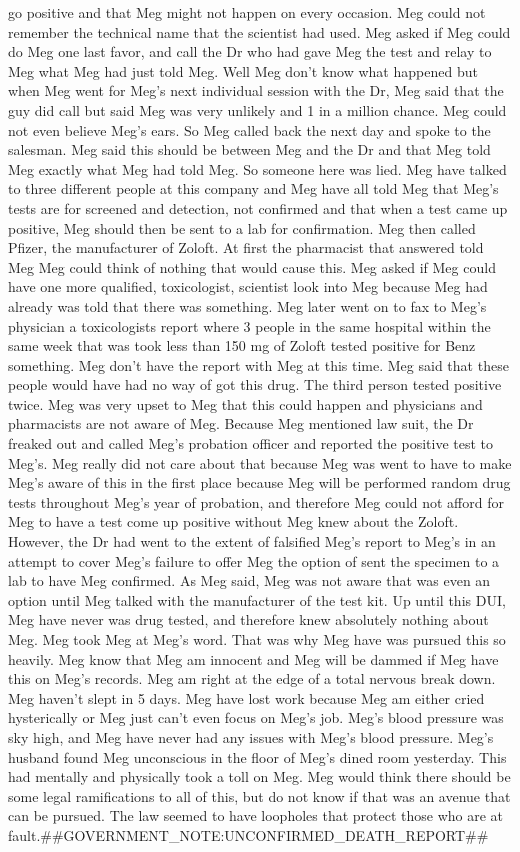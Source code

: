 \documentclass[12pt]{book}
\begin{document}
go positive and that Meg might not happen on every occasion. Meg could not remember the technical name that the scientist had used. Meg asked if Meg could do Meg one last favor, and call the Dr who had gave Meg the test and relay to Meg what Meg had just told Meg. Well Meg don't know what happened but when Meg went for Meg's next individual session with the Dr, Meg said that the guy did call but said Meg was very unlikely and 1 in a million chance. Meg could not even believe Meg's ears. So Meg called back the next day and spoke to the salesman. Meg said this should be between Meg and the Dr and that Meg told Meg exactly what Meg had told Meg. So someone here was lied. Meg have talked to three different people at this company and Meg have all told Meg that Meg's tests are for screened and detection, not confirmed and that when a test came up positive, Meg should then be sent to a lab for confirmation. Meg then called Pfizer, the manufacturer of Zoloft. At first the pharmacist that answered told Meg Meg could think of nothing that would cause this. Meg asked if Meg could have one more qualified, toxicologist, scientist look into Meg because Meg had already was told that there was something. Meg later went on to fax to Meg's physician a toxicologists report where 3 people in the same hospital within the same week that was took less than 150 mg of Zoloft tested positive for Benz something. Meg don't have the report with Meg at this time. Meg said that these people would have had no way of got this drug. The third person tested positive twice. Meg was very upset to Meg that this could happen and physicians and pharmacists are not aware of Meg. Because Meg mentioned law suit, the Dr freaked out and called Meg's probation officer and reported the positive test to Meg's. Meg really did not care about that because Meg was went to have to make Meg's aware of this in the first place because Meg will be performed random drug tests throughout Meg's year of probation, and therefore Meg could not afford for Meg to have a test come up positive without Meg knew about the Zoloft. However, the Dr had went to the extent of falsified Meg's report to Meg's in an attempt to cover Meg's failure to offer Meg the option of sent the specimen to a lab to have Meg confirmed. As Meg said, Meg was not aware that was even an option until Meg talked with the manufacturer of the test kit. Up until this DUI, Meg have never was drug tested, and therefore knew absolutely nothing about Meg. Meg took Meg at Meg's word. That was why Meg have was pursued this so heavily. Meg know that Meg am innocent and Meg will be dammed if Meg have this on Meg's records. Meg am right at the edge of a total nervous break down. Meg haven't slept in 5 days. Meg have lost work because Meg am either cried hysterically or Meg just can't even focus on Meg's job. Meg's blood pressure was sky high, and Meg have never had any issues with Meg's blood pressure. Meg's husband found Meg unconscious in the floor of Meg's dined room yesterday. This had mentally and physically took a toll on Meg. Meg would think there should be some legal ramifications to all of this, but do not know if that was an avenue that can be pursued. The law seemed to have loopholes that protect those who are at fault.\#\#GOVERNMENT\_NOTE:UNCONFIRMED\_DEATH\_REPORT\#\# 
\end{document}
